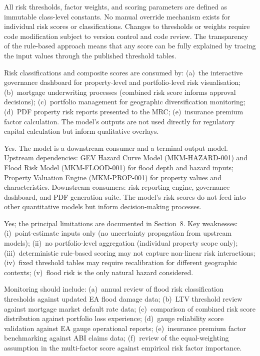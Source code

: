 \documentclass[11pt,a4paper]{article}
\begin{document}
All risk thresholds, factor weights, and scoring parameters are defined as immutable class-level constants. No manual override mechanism exists for individual risk scores or classifications. Changes to thresholds or weights require code modification subject to version control and code review. The transparency of the rule-based approach means that any score can be fully explained by tracing the input values through the published threshold tables.

Risk classifications and composite scores are consumed by: (a)~the interactive governance dashboard for property-level and portfolio-level risk visualisation; (b)~mortgage underwriting processes (combined risk score informs approval decisions); (c)~portfolio management for geographic diversification monitoring; (d)~PDF property risk reports presented to the MRC; (e)~insurance premium factor calculation. The model's outputs are not used directly for regulatory capital calculation but inform qualitative overlays.

Yes. The model is a downstream consumer and a terminal output model. Upstream dependencies: GEV Hazard Curve Model (MKM-HAZARD-001) and Flood Risk Model (MKM-FLOOD-001) for flood depth and hazard inputs; Property Valuation Engine (MKM-PROP-001) for property values and characteristics. Downstream consumers: risk reporting engine, governance dashboard, and PDF generation suite. The model's risk scores do not feed into other quantitative models but inform decision-making processes.

Yes; the principal limitations are documented in Section~8. Key weaknesses: (i)~point-estimate inputs only (no uncertainty propagation from upstream models); (ii)~no portfolio-level aggregation (individual property scope only); (iii)~deterministic rule-based scoring may not capture non-linear risk interactions; (iv)~fixed threshold tables may require recalibration for different geographic contexts; (v)~flood risk is the only natural hazard considered.

Monitoring should include: (a)~annual review of flood risk classification thresholds against updated EA flood damage data; (b)~LTV threshold review against mortgage market default rate data; (c)~comparison of combined risk score distribution against portfolio loss experience; (d)~gauge reliability score validation against EA gauge operational reports; (e)~insurance premium factor benchmarking against ABI claims data; (f)~review of the equal-weighting assumption in the multi-factor score against empirical risk factor importance.
\end{document}

